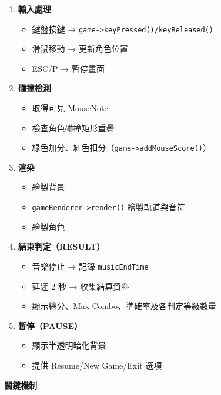 \documentclass[a4paper,12pt]{article}
\begin{document}
\begin{enumerate}
\begin{itemize}
\begin{itemize}
    \end{itemize}
  \end{itemize}
  \item \textbf{輸入處理}
  \begin{itemize}
    \item 鍵盤按鍵 → \verb|game->keyPressed()/keyReleased()|
    \item 滑鼠移動 → 更新角色位置
    \item ESC/P → 暫停畫面
  \end{itemize}
  \item \textbf{碰撞檢測}
  \begin{itemize}
    \item 取得可見 MouseNote
    \item 檢查角色碰撞矩形重疊
    \item 綠色加分、紅色扣分（\verb|game->addMouseScore()|）
  \end{itemize}
  \item \textbf{渲染}
  \begin{itemize}
    \item 繪製背景
    \item \verb|gameRenderer->render()| 繪製軌道與音符
    \item 繪製角色
  \end{itemize}
  \item \textbf{結束判定（RESULT）}
  \begin{itemize}
    \item 音樂停止 → 記錄 \verb|musicEndTime|
    \item 延遲 2 秒 → 收集結算資料
    \item 顯示總分、Max Combo、準確率及各判定等級數量
  \end{itemize}
  \item \textbf{暫停（PAUSE）}
  \begin{itemize}
    \item 顯示半透明暗化背景
    \item 提供 Resume/New Game/Exit 選項
  \end{itemize}
\end{enumerate}
\textbf{關鍵機制}
\end{document}
